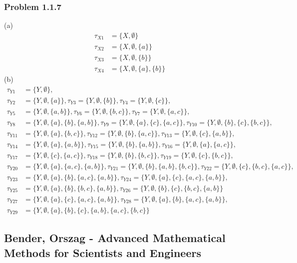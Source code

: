 \documentclass[10pt,a4paper]{book}
\theoremstyle{definition}
\begin{document}
\subsubsection{Problem 1.1.7}
(a) 
\begin{align}
\tau_{X1}&=\{X,\emptyset\}\\
\tau_{X2}&=\{X,\emptyset,\{a\}\}\\
\tau_{X3}&=\{X,\emptyset,\{b\}\}\\
\tau_{X4}&=\{X,\emptyset,\{a\},\{b\}\}
\end{align}
(b) 
\begin{align}
\tau_{Y1}&=\{Y,\emptyset\},\\
%
\tau_{Y2}&=\{Y,\emptyset,\{a\}\},\tau_{Y3}=\{Y,\emptyset,\{b\}\},\tau_{Y4}=\{Y,\emptyset,\{c\}\},\\
%
\tau_{Y5}&=\{Y,\emptyset,\{a,b\}\},\tau_{Y6}=\{Y,\emptyset,\{b,c\}\},\tau_{Y7}=\{Y,\emptyset,\{a,c\}\},\\
%
\tau_{Y8}&=\{Y,\emptyset,\{a\},\{b\},\{a,b\}\},
\tau_{Y9}=\{Y,\emptyset,\{a\},\{c\},\{a,c\}\},
\tau_{Y10}=\{Y,\emptyset,\{b\},\{c\},\{b,c\}\},\\
%
\tau_{Y11}&=\{Y,\emptyset,\{a\},\{b,c\}\},
\tau_{Y12}=\{Y,\emptyset,\{b\},\{a,c\}\},
\tau_{Y13}=\{Y,\emptyset,\{c\},\{a,b\}\},\\
%
\tau_{Y14}&=\{Y,\emptyset,\{a\},\{a,b\}\},
\tau_{Y15}=\{Y,\emptyset,\{b\},\{a,b\}\},
\tau_{Y16}=\{Y,\emptyset,\{a\},\{a,c\}\},\\
%
\tau_{Y17}&=\{Y,\emptyset,\{c\},\{a,c\}\},
\tau_{Y18}=\{Y,\emptyset,\{b\},\{b,c\}\},
\tau_{Y19}=\{Y,\emptyset,\{c\},\{b,c\}\},\\
%
\tau_{Y20}&=\{Y,\emptyset,\{a\},\{a,c\},\{a,b\}\},
\tau_{Y21}=\{Y,\emptyset,\{b\},\{a,b\},\{b,c\}\},
\tau_{Y22}=\{Y,\emptyset,\{c\},\{b,c\},\{a,c\}\},\\
%
\tau_{Y23}&=\{Y,\emptyset,\{a\},\{b\},\{a,c\},\{a,b\}\},
\tau_{Y24}=\{Y,\emptyset,\{a\},\{c\},\{a,c\},\{a,b\}\},\\
%
\tau_{Y25}&=\{Y,\emptyset,\{a\},\{b\},\{b,c\},\{a,b\}\},
\tau_{Y26}=\{Y,\emptyset,\{b\},\{c\},\{b,c\},\{a,b\}\}\\
%
\tau_{Y27}&=\{Y,\emptyset,\{a\},\{c\},\{a,c\},\{a,b\}\},
\tau_{Y28}=\{Y,\emptyset,\{a\},\{b\},\{a,c\},\{a,b\}\},\\
%
\tau_{Y29}&=\{Y,\emptyset,\{a\},\{b\},\{c\},\{a,b\},\{a,c\},\{b,c\}\}
\end{align}

\subsection{{\sc Bender, Orszag} - Advanced Mathematical Methods for Scientists and Engineers}
\end{document}
